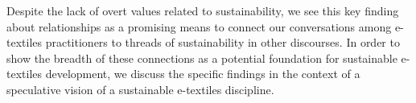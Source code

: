 Despite the lack of overt values related to sustainability, we see this key finding about relationships as a promising means to connect our conversations among e-textiles practitioners to threads of sustainability in other discourses. In order to show the breadth of these connections as a potential foundation for sustainable e-textiles development, we discuss the specific findings in the context of a speculative vision of a sustainable e-textiles discipline. 



